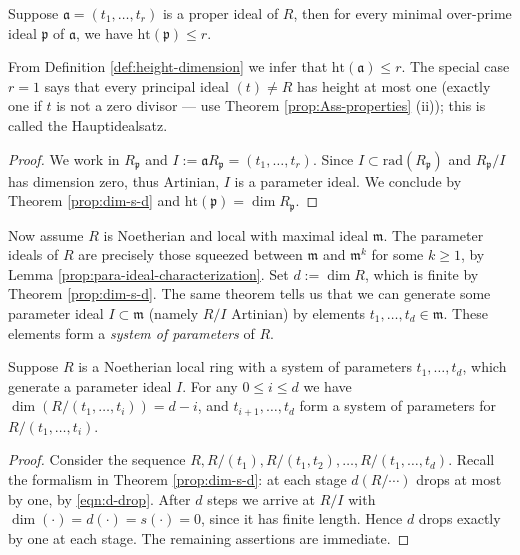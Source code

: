\begin{theorem}[Krull]
	Suppose $\mathfrak{a} = (t_1, \ldots, t_r)$ is a proper ideal of $R$, then for every minimal over-prime ideal $\mathfrak{p}$ of $\mathfrak{a}$, we have $\mathrm{ht}(\mathfrak{p}) \leq r$.
\end{theorem}
From Definition \ref{def:height-dimension} we infer that $\text{ht}(\mathfrak{a}) \leq r$. The special case $r=1$ says that every principal ideal $(t) \neq R$ has height at most one (exactly one if $t$ is not a zero divisor --- use Theorem \ref{prop:Ass-properties} (ii)); this is called the Hauptidealsatz.
\begin{proof}
	We work in $R_{\mathfrak{p}}$ and $I := \mathfrak{a} R_{\mathfrak{p}} = (t_1, \ldots, t_r)$. Since $I \subset \text{rad}(R_{\mathfrak{p}})$ and $R_{\mathfrak{p}}/I$ has dimension zero, thus Artinian, $I$ is a parameter ideal. We conclude by Theorem \ref{prop:dim-s-d} and $\text{ht}(\mathfrak{p}) = \dim R_{\mathfrak{p}}$.
\end{proof}

Now assume $R$ is Noetherian and local with maximal ideal $\mathfrak{m}$. The parameter ideals of $R$ are precisely those squeezed between $\mathfrak{m}$ and $\mathfrak{m}^k$ for some $k \geq 1$, by Lemma \ref{prop:para-ideal-characterization}. Set $d := \dim R$, which is finite by Theorem \ref{prop:dim-s-d}. The same theorem tells us that we can generate some parameter ideal $I \subset \mathfrak{m}$ (namely $R/I$ Artinian) by elements $t_1, \ldots, t_d \in \mathfrak{m}$. These elements form a \emph{system of parameters} of $R$.

\begin{proposition}\label{prop:system-parameter}
	Suppose $R$ is a Noetherian local ring with a system of parameters $t_1, \ldots, t_d$, which generate a parameter ideal $I$. For any $0 \leq i \leq d$ we have $\dim(R/(t_1, \ldots, t_i)) = d-i$, and $t_{i+1}, \ldots, t_d$ form a system of parameters for $R/(t_1, \ldots, t_i)$.
\end{proposition}
\begin{proof}
	Consider the sequence $R, R/(t_1), R/(t_1, t_2), \ldots, R/(t_1, \ldots, t_d)$. Recall the formalism in Theorem \ref{prop:dim-s-d}: at each stage $d(R/\cdots)$ drops at most by one, by \eqref{eqn:d-drop}. After $d$ steps we arrive at $R/I$ with $\dim(\cdot)=d(\cdot)=s(\cdot)=0$, since it has finite length. Hence $d$ drops exactly by one at each stage. The remaining assertions are immediate.
\end{proof}

